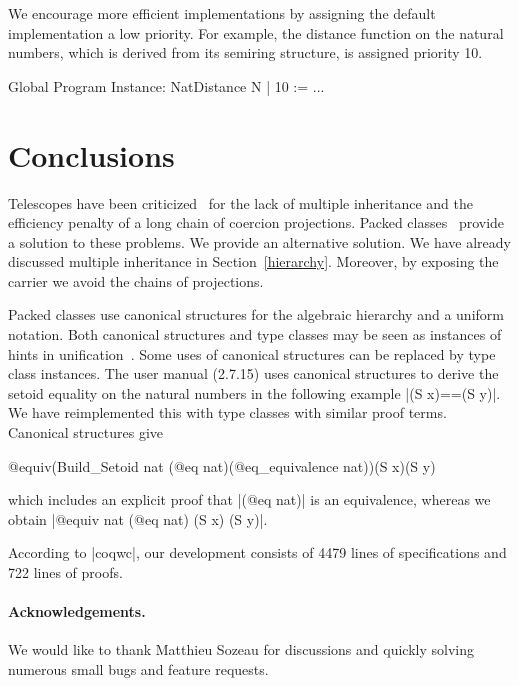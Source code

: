 \documentclass{llncs}
\begin{document}
We encourage more efficient implementations by assigning the default implementation a
low priority. For example, the distance function on the natural numbers, which is derived from its
semiring structure, is assigned priority 10.
\begin{code}
  Global Program Instance: NatDistance N | 10 := ...
\end{code}

\section{Conclusions}
Telescopes have been criticized~\cite{Packed} for the lack of multiple inheritance and
the efficiency penalty of a long chain of coercion projections. Packed classes~\cite{Packed} provide
a solution to these problems. We provide an alternative solution. We have already
discussed multiple inheritance in Section~\ref{hierarchy}. Moreover, by exposing the
carrier we avoid the chains of projections.

Packed classes use canonical structures for the algebraic hierarchy and a uniform notation. Both
canonical structures and
type classes may be seen as instances of hints in unification~\cite{Hints}. Some uses of canonical
structures can be replaced by type class instances. The user manual (2.7.15) uses canonical
structures to derive the setoid equality on the natural
numbers in the following example |(S x)==(S y)|. We have reimplemented this with
type classes with similar proof terms. Canonical structures give
\begin{code}
@equiv(Build_Setoid nat (@eq nat)(@eq_equivalence nat))(S x)(S y)
\end{code}

which includes an explicit proof that |(@eq nat)| is an equivalence,
whereas we obtain |@equiv nat (@eq nat) (S x) (S y)|.

According to |coqwc|, our development consists of 4479 lines of specifications and 722 lines of
proofs.

\paragraph{Acknowledgements.}
We would like to thank Matthieu Sozeau for discussions and quickly solving numerous small bugs and
feature requests.


\end{document}
